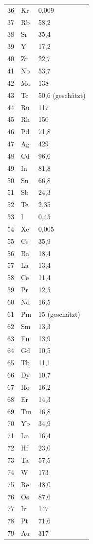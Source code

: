 \documentclass[12pt,a4paper]{article}
\begin{document}
\begin{longtable}{p{0.6cm}p{1.2cm}p{1.5cm}}
		36 & Kr & 0,009 \\
		37 & Rb & 58,2 \\
		38 & Sr & 35,4 \\
		39 & Y  & 17,2 \\
		40 & Zr & 22,7 \\
		41 & Nb & 53,7 \\
		42 & Mo & 138 \\
		43 & Tc & 50,6 (geschätzt) \\
		44 & Ru & 117 \\
		45 & Rh & 150 \\
		46 & Pd & 71,8 \\
		47 & Ag & 429 \\
		48 & Cd & 96,6 \\
		49 & In & 81,8 \\
		50 & Sn & 66,8 \\
		51 & Sb & 24,3 \\
		52 & Te & 2,35 \\
		53 & I  & 0,45 \\
		54 & Xe & 0,005 \\
		55 & Cs & 35,9 \\
		56 & Ba & 18,4 \\
		57 & La & 13,4 \\
		58 & Ce & 11,4 \\
		59 & Pr & 12,5 \\
		60 & Nd & 16,5 \\
		61 & Pm & 15 (geschätzt) \\
		62 & Sm & 13,3 \\
		63 & Eu & 13,9 \\
		64 & Gd & 10,5 \\
		65 & Tb & 11,1 \\
		66 & Dy & 10,7 \\
		67 & Ho & 16,2 \\
		68 & Er & 14,3 \\
		69 & Tm & 16,8 \\
		70 & Yb & 34,9 \\
		71 & Lu & 16,4 \\
		72 & Hf & 23,0 \\
		73 & Ta & 57,5 \\
		74 & W  & 173 \\
		75 & Re & 48,0 \\
		76 & Os & 87,6 \\
		77 & Ir & 147 \\
		78 & Pt & 71,6 \\
		79 & Au & 317 \\

\end{longtable}
\end{document}
